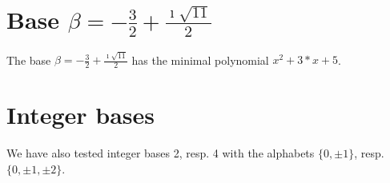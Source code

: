 \section{Base $\beta = -\frac{3}{2} + \frac{\imath \sqrt{11}}{2}$}
The base $\beta = -\frac{3}{2} + \frac{\imath \sqrt{11}}{2}$ has the minimal polynomial  $x^2+3*x +5$.


% 

\section{Integer bases}
We have also tested integer bases 2, resp. 4 with the alphabets $\{0,\pm 1\}$, resp. $\{0,\pm 1, \pm 2\}$.

